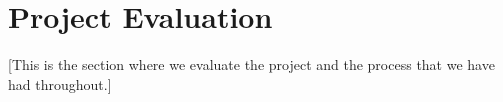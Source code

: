 \section{Project Evaluation}\label{Project Evaluation}
    [This is the section where we evaluate the project and the process that we have had throughout.]
    
